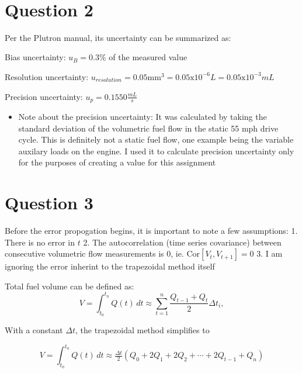 \documentclass[11pt]{article}
\providecommand{\tightlist}{%
      \setlength{\itemsep}{0pt}\setlength{\parskip}{0pt}}
\begin{document}
    \begin{center}
    \end{center}
    { \hspace*{\fill} \\}
    
    \hypertarget{question-2}{%
\section{Question 2}\label{question-2}}

    Per the Plutron manual, its uncertainty can be summarized as:

Bias uncertainty: \(u_B = 0.3 \%\) of the measured value

Resolution uncertainty:
\(u_{resolution} = 0.05\text{mm}^3 = 0.05\text{x10}^{-6}L = 0.05\text{x10}^{-3}mL\)

Precision uncertainty: \(u_p = 0.1550 \frac{mL}{s}\)

\begin{itemize}
\tightlist
\item
  Note about the precision uncertainty: It was calculated by taking the
  standard deviation of the volumetric fuel flow in the static 55 mph
  drive cycle. This is definitely not a static fuel flow, one example
  being the variable auxilary loads on the engine. I used it to
  calculate precision uncertainty only for the purposes of creating a
  value for this assignment
\end{itemize}

    \hypertarget{question-3}{%
\section{Question 3}\label{question-3}}

    Before the error propogation begins, it is important to note a few
assumptions: 1. There is no error in \(t\) 2. The autocorrelation (time
series covariance) between consecutive volumetric flow measurements is
0, ie. \(\mathrm{Cor}[V_t, V_{t+1}] = 0\) 3. I am ignoring the error
inherint to the trapezoidal method itself

Total fuel volume can be defined as:
\[V = \int_{t_0}^{t_n} Q(t)\, dt \approx \sum_{t=1}^n \frac{Q_{t-1} + Q_t}{2} \Delta t_i,\]

With a constant \(\Delta t\), the trapezoidal method simplifies to

\[V = \int_{t_0}^{t_n} Q(t)\, dt \approx \tfrac{\Delta t}{2}\left(Q_0 + 2Q_1+2Q_2 + \cdots+2Q_{t-1} + Q_n\right)\]
\end{document}

